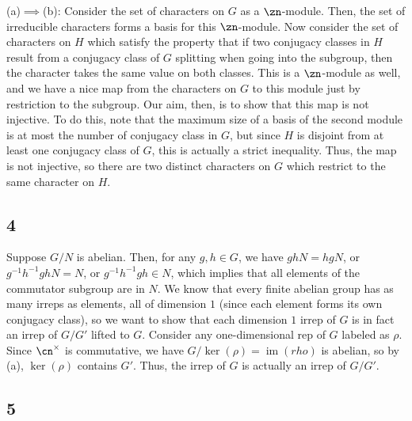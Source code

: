 \documentclass{article}
\DeclareMathOperator{\im}{im}
\begin{document}
(a)$\implies$(b): Consider the set of characters on $G$ as a $\zn$-module. Then, the set of irreducible characters forms a basis for this $\zn$-module. Now consider the set of characters on $H$ which satisfy the property that if two conjugacy classes in $H$ result from a conjugacy class of $G$ splitting when going into the subgroup, then the character takes the same value on both classes. This is a $\zn$-module as well, and we have a nice map from the characters on $G$ to this module just by restriction to the subgroup. Our aim, then, is to show that this map is not injective. To do this, note that the maximum size of a basis of the second module is at most the number of conjugacy class in $G$, but since $H$ is disjoint from at least one conjugacy class of $G$, this is actually a strict inequality. Thus, the map is not injective, so there are two distinct characters on $G$ which restrict to the same character on $H$.
\subsection*{4}
Suppose $G/N$ is abelian. Then, for any $g,h\in G$, we have $ghN=hgN$, or $g^{-1}h^{-1}ghN=N$, or $g^{-1}h^{-1}gh\in N$, which implies that all elements of the commutator subgroup are in $N$.
We know that every finite abelian group has as many irreps as elements, all of dimension $1$ (since each element forms its own conjugacy class), so we want to show that each dimension $1$ irrep of $G$ is in fact an irrep of $G/G'$ lifted to $G$. Consider any one-dimensional rep of $G$ labeled as $\rho$. Since $\cn^\times$ is commutative, we have $G/\ker(\rho)=\im(rho)$ is abelian, so by (a), $\ker(\rho)$ contains $G'$. Thus, the irrep of $G$ is actually an irrep of $G/G'$.
\subsection*{5}
\end{document}
